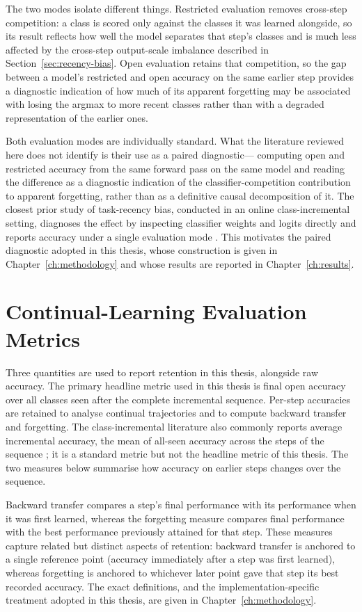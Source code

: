 The two modes isolate different things. Restricted evaluation removes
cross-step competition: a class is scored only against the classes it was
learned alongside, so its result reflects how well the model separates that
step's classes and is much less affected by the cross-step output-scale
imbalance described in Section~\ref{sec:recency-bias}. Open evaluation
retains that competition, so the gap between a model's restricted and open
accuracy on the same earlier step provides a diagnostic indication of how
much of its apparent forgetting may be associated with losing the argmax to
more recent classes rather than with a degraded representation of the
earlier ones.

Both evaluation modes are individually standard. What the literature
reviewed here does not identify is their use as a paired diagnostic---%
computing open and restricted accuracy from the same forward pass on the
same model and reading the difference as a diagnostic indication of the
classifier-competition contribution to apparent forgetting, rather than as a
definitive causal decomposition of it. The closest
prior study of task-recency bias, conducted in an online class-incremental
setting, diagnoses the effect by inspecting classifier weights and logits
directly and reports accuracy under a single evaluation mode \parencite{liang2023new}.
This motivates the paired diagnostic adopted in this thesis,
whose construction is given in Chapter~\ref{ch:methodology} and whose results are reported in
Chapter~\ref{ch:results}.

\section{Continual-Learning Evaluation Metrics}
\label{sec:cl-metrics}

Three quantities are used to report retention in this thesis, alongside raw
accuracy. The primary headline metric used in this thesis is final open
accuracy over all classes seen after the complete incremental sequence.
Per-step accuracies are retained to analyse continual trajectories and to
compute backward transfer and forgetting. The class-incremental literature
also commonly reports average incremental accuracy, the mean of all-seen
accuracy across the steps of the sequence
\parencite{masana2020classincremental}; it is a standard metric but not the
headline metric of this thesis. The two measures below summarise how
accuracy on earlier steps changes over the sequence.

Backward transfer \parencite{lopezpaz2017gradient} compares a step's final
performance with its performance when it was first learned, whereas the
forgetting measure \parencite{chaudhry2018riemannian} compares final
performance with the best performance previously attained for that step.
These measures capture related but distinct aspects of retention: backward
transfer is anchored to a single reference point (accuracy immediately after
a step was first learned), whereas forgetting is anchored to whichever later
point gave that step its best recorded accuracy. The exact definitions, and
the implementation-specific treatment adopted in this thesis, are given in
Chapter~\ref{ch:methodology}.

